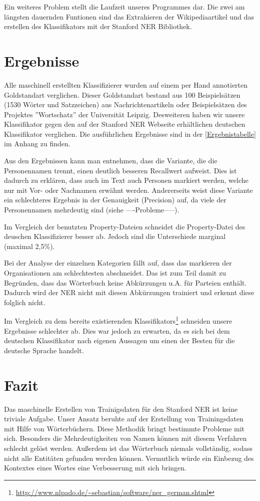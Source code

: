\documentclass[a4paper]{article}
\begin{document}
	Ein weiteres Problem stellt die Laufzeit unseres Programmes dar. 
	Die zwei am längsten dauernden Funtionen sind das Extrahieren der Wikipediaartikel und das erstellen des Klassifikators mit der Stanford NER Bibliothek.
\section{Ergebnisse}
	Alle maschinell erstellten Klassifizierer wurden auf einem per Hand annotierten Goldstandart verglichen. 
	Dieser Goldstandart bestand aus 100 Beispielsätzen (1530 Wörter und Satzzeichen) aus Nachrichtenartikeln oder Beispielsätzen des Projektes ''Wortschatz'' der Universität Leipzig. 
	Desweiteren haben wir unsere Klassifikator gegen den auf der Stanford NER Webseite erhältlichen deutschen Klassifikator  verglichen. 
	Die ausführlichen Ergebnisse sind in der \autoref{Ergebnistabelle} im Anhang zu finden.
	
	Aus den Ergebnissen kann man entnehmen, dass die Variante, die die Personennamen trennt, einen deutlich besseren Recallwert aufweist. 
	Dies ist dadurch zu erklären, dass auch im Text auch Personen markiert werden, welche nur mit Vor- oder Nachnamen erwähnt werden. 
	Andererseits weist diese Variante ein schlechteres Ergebnis in der Genauigkeit (Precision) auf, da viele der Personennamen mehrdeutig sind (siehe ----Probleme-----).
	
	Im Vergleich der benutzten Property-Dateien schneidet die Property-Datei des deuschen Klassifizierer besser ab. 
	Jedoch sind die Unterschiede marginal (maximal 2,5\%). 	
	
	Bei der Analyse der einzelnen Kategorien fällt auf, dass das markieren der Organisationen am schlechtesten abschneidet. 
	Das ist zum Teil damit zu Begründen, dass das Wörterbuch keine Abkürzungen u.A. für Parteien enthält. 
	Dadurch wird der NER nicht mit diesen Abkürzungen trainiert und erkennt diese folglich nicht. 
	
	Im Vergleich zu dem bereits existierenden Klassifikators\footnote{\url{http://www.nlpado.de/~sebastian/software/ner_german.shtml}} schneiden unsere Ergebnisse schlechter ab. 
	Dies war jedoch zu erwarten, da es sich bei dem deutschen Klassifikator nach eigenen Aussagen um einen der Besten für die deutsche Sprache handelt. 
	
\section{Fazit}	
	Das maschinelle Erstellen von Trainigsdaten für den Stanford NER ist keine triviale Aufgabe. 
	Unser Ansatz beruhte auf der Erstellung von Trainingsdaten mit Hilfe von Wörterbüchern. 
	Diese Methodik bringt bestimmte Probleme mit sich. 
	Besonders die Mehrdeutigkeiten von Namen können mit diesem Verfahren schlecht gelöst werden. 
	Außerdem ist das Wörterbuch niemals vollständig, sodass nicht alle Entitäten gefunden werden können. 
	Vermutlich würde ein Einbezug des Kontextes eines Wortes eine Verbesserung mit sich bringen. 
	
\end{document}
